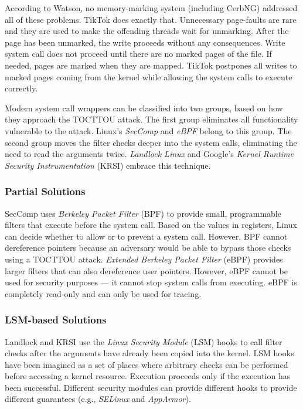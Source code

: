 According to Watson, no memory-marking system (including CerbNG) addressed all
of these problems. TikTok does exactly that. Unnecessary page-faults are rare
and they are used to make the offending threads wait for unmarking. After the
page has been unmarked, the write proceeds without any consequences. Write
system call does not proceed until there are no marked pages of the file. If
needed, pages are marked when they are mapped. TikTok postpones all writes to
marked pages coming from the kernel while allowing the system calls to execute
correctly.

Modern system call wrappers can be classified into two groups, based on how they
approach the TOCTTOU attack. The first group eliminates all functionality
vulnerable to the attack. Linux's \emph{SecComp}\cite{seccomp} and
\emph{eBPF}\cite{ebpf} belong to this group. The second group moves the filter
checks deeper into the system calls, eliminating the need to read the arguments
twice. \emph{Landlock Linux} \cite{landlock} and Google's \emph{Kernel Runtime
Security Instrumentation} (KRSI)\cite{krsi} embrace this technique.

\subsubsection{Partial Solutions}
SecComp\cite{seccomp} uses \emph{Berkeley Packet Filter} (BPF) to provide small,
programmable filters that execute before the system call. Based on the values
in registers, Linux can decide whether to allow or to prevent a system call.
However, BPF cannot dereference pointers because an adversary would be able to
bypass those checks using a TOCTTOU attack. \emph{Extended Berkeley Packet
Filter} (eBPF)\cite{ebpf} provides larger filters that can also dereference
user pointers. However, eBPF cannot be used for security purposes --- it cannot
stop system calls from executing. eBPF is completely read-only and can only be
used for tracing.

\subsubsection{LSM-based Solutions}
Landlock\cite{landlock} and KRSI\cite{krsi} use the \emph{Linux Security Module}
\cite{morris2002linux} (LSM) hooks to call filter checks after the arguments
have already been copied into the kernel. LSM hooks have been imagined as a set
of places where arbitrary checks can be performed before accessing a kernel
resource. Execution proceeds only if the execution has been successful.
Different security modules can provide different hooks to provide different
guarantees (e.g., \emph{SELinux}\cite{smalley2001implementing} and
\emph{AppArmor}\cite{gruenbacher2007apparmor}).

